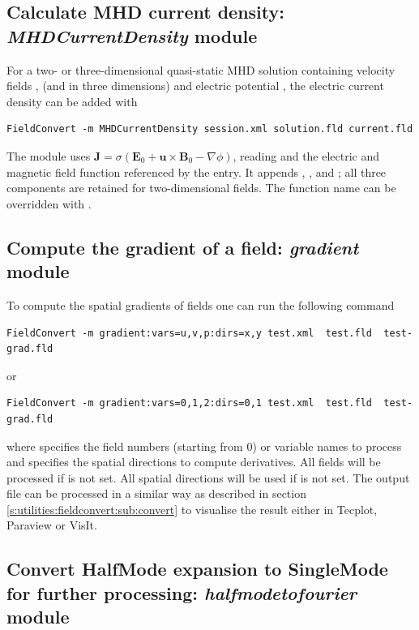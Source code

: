 \subsection{Calculate MHD current density: \textit{MHDCurrentDensity} module}
For a two- or three-dimensional quasi-static MHD solution containing velocity
fields ,  (and  in three dimensions) and electric
potential , the electric current density can be added with
%
\begin{lstlisting}[style=BashInputStyle]
FieldConvert -m MHDCurrentDensity session.xml solution.fld current.fld
\end{lstlisting}
%
The module uses
$\boldsymbol{J}=\sigma(\boldsymbol{E}_0+\boldsymbol{u}\times\boldsymbol{B}_0-
\nabla\phi)$, reading  and the electric and magnetic
field function referenced by the 
 entry. It appends , , and
; all three components are retained for two-dimensional fields. The
function name can be overridden with
.
%
%
%
\subsection{Compute the gradient of a field: \textit{gradient} module}
To compute the spatial gradients of fields one can run the following command
%
\begin{lstlisting}[style=BashInputStyle]
FieldConvert -m gradient:vars=u,v,p:dirs=x,y test.xml  test.fld  test-grad.fld
\end{lstlisting}
or
\begin{lstlisting}[style=BashInputStyle]
  FieldConvert -m gradient:vars=0,1,2:dirs=0,1 test.xml  test.fld  test-grad.fld
\end{lstlisting}
%
where  specifies the field numbers (starting from 0) or variable names to process and
 specifies the spatial directions to compute derivatives. All fields will be
processed if  is not set. All spatial directions will be used if  is not set.
The output file  can be processed in a similar
way as described in section \ref{s:utilities:fieldconvert:sub:convert}
to visualise the result either in Tecplot, Paraview or VisIt.
%
%

\subsection{Convert HalfMode expansion to SingleMode for further processing: \textit{halfmodetofourier} module}


